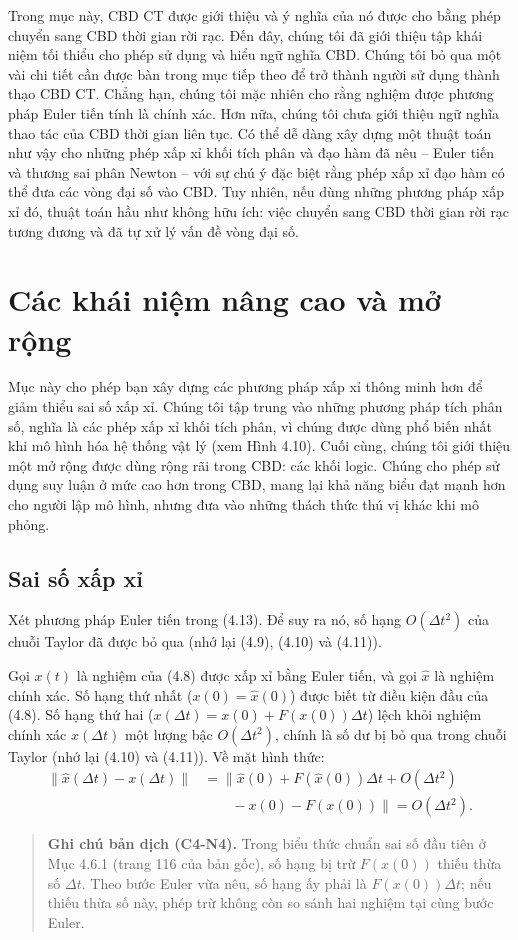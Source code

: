 Trong mục này, CBD CT được giới thiệu và ý nghĩa của nó được cho bằng phép chuyển sang CBD thời gian rời rạc. Đến đây, chúng tôi đã giới thiệu tập khái niệm tối thiểu cho phép sử dụng và hiểu ngữ nghĩa CBD. Chúng tôi bỏ qua một vài chi tiết cần được bàn trong mục tiếp theo để trở thành người sử dụng thành thạo CBD CT. Chẳng hạn, chúng tôi mặc nhiên cho rằng nghiệm được phương pháp Euler tiến tính là chính xác. Hơn nữa, chúng tôi chưa giới thiệu ngữ nghĩa thao tác của CBD thời gian liên tục. Có thể dễ dàng xây dựng một thuật toán như vậy cho những phép xấp xỉ khối tích phân và đạo hàm đã nêu -- Euler tiến và thương sai phân Newton -- với sự chú ý đặc biệt rằng phép xấp xỉ đạo hàm có thể đưa các vòng đại số vào CBD. Tuy nhiên, nếu dùng những phương pháp xấp xỉ đó, thuật toán hầu như không hữu ích: việc chuyển sang CBD thời gian rời rạc tương đương và đã tự xử lý vấn đề vòng đại số.

\section{Các khái niệm nâng cao và mở rộng}
Mục này cho phép bạn xây dựng các phương pháp xấp xỉ thông minh hơn để giảm thiểu sai số xấp xỉ. Chúng tôi tập trung vào những phương pháp tích phân số, nghĩa là các phép xấp xỉ khối tích phân, vì chúng được dùng phổ biến nhất khi mô hình hóa hệ thống vật lý (xem Hình 4.10). Cuối cùng, chúng tôi giới thiệu một mở rộng được dùng rộng rãi trong CBD: các khối logic. Chúng cho phép sử dụng suy luận ở mức cao hơn trong CBD, mang lại khả năng biểu đạt mạnh hơn cho người lập mô hình, nhưng đưa vào những thách thức thú vị khác khi mô phỏng.
\subsection{Sai số xấp xỉ}
Xét phương pháp Euler tiến trong (4.13). Để suy ra nó, số hạng $O(\Delta t^2)$ của chuỗi Taylor đã được bỏ qua (nhớ lại (4.9), (4.10) và (4.11)).

Gọi $x(t)$ là nghiệm của (4.8) được xấp xỉ bằng Euler tiến, và gọi $\hat x$ là nghiệm chính xác. Số hạng thứ nhất ($x(0)=\hat x(0)$) được biết từ điều kiện đầu của (4.8). Số hạng thứ hai ($x(\Delta t)=x(0)+F(x(0))\Delta t$) lệch khỏi nghiệm chính xác $\hat x(\Delta t)$ một lượng bậc $O(\Delta t^2)$, chính là số dư bị bỏ qua trong chuỗi Taylor (nhớ lại (4.10) và (4.11)). Về mặt hình thức:
\[\begin{aligned}
\lVert\hat x(\Delta t)-x(\Delta t)\rVert
&=\bigl\lVert\hat x(0)+F(\hat x(0))\Delta t+O(\Delta t^2)\\
&\qquad-x(0)-F(x(0))\bigr\rVert=O(\Delta t^2).
\end{aligned}\]
\begin{quote}\small
\textbf{Ghi chú bản dịch (C4-N4).} Trong biểu thức chuẩn sai số đầu tiên ở Mục 4.6.1 (trang 116 của bản gốc), số hạng bị trừ $F(x(0))$ thiếu thừa số $\Delta t$. Theo bước Euler vừa nêu, số hạng ấy phải là $F(x(0))\Delta t$; nếu thiếu thừa số này, phép trừ không còn so sánh hai nghiệm tại cùng bước Euler.
\end{quote}

